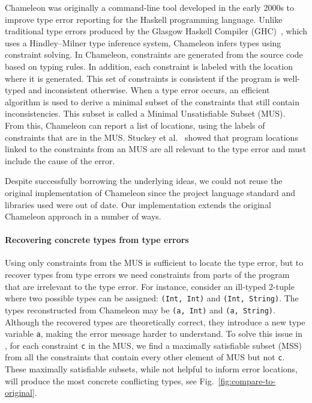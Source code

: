 Chameleon was originally a command-line tool developed in the early 2000s to improve type error reporting %
for the Haskell programming language.
Unlike traditional type errors produced by the Glasgow Haskell Compiler (GHC)~\cite{ben_gamari_home_2022}, which uses a Hindley–Milner type inference system, Chameleon infers types using constraint solving. In Chameleon, constraints are generated from the source code based on typing rules. In addition, each constraint is labeled with the location where it is generated. This set of constraints is consistent if the program is well-typed and inconsistent otherwise. When a type error occurs, an efficient algorithm is used to derive a minimal subset of the constraints that still contain inconsistencies. This subset is called a Minimal Unsatisfiable Subset (MUS). From this, Chameleon can report a list of locations, using the labels of constraints that are in the MUS. Stuckey et al.~\cite{stuckey_interactive_2003} showed that program locations linked to the constraints from an MUS are all relevant to the type error and must include the cause of the error.

Despite successfully borrowing the underlying ideas, we could not reuse the original implementation of Chameleon since the project language standard and libraries used were out of date. 
Our \chameleon{} implementation extends the original Chameleon approach in a number of ways.



\paragraph{Recovering concrete types from type errors}


Using only constraints from the MUS is sufficient to locate the type error, but to recover types from type errors we need  constraints from parts of the program that are irrelevant to the type error.  For instance, consider an ill-typed 2-tuple where two possible types can be assigned: \texttt{(Int, Int)} and \texttt{(Int, String)}. The types reconstructed from Chameleon may be \texttt{(a, Int)} and \texttt{(a, String)}. Although the recovered types are theoretically correct, they introduce a new type variable \texttt{a}, making the error message harder to understand. To solve this issue in \chameleon{}, for each constraint \texttt{c} in the MUS, we find a maximally satisfiable subset (MSS) from all the constraints that contain every other element of MUS but not \texttt{c}. These maximally satisfiable subsets, while not helpful to inform error locations, will produce the most concrete conflicting types, see Fig.~\ref{fig:compare-to-original}. 


